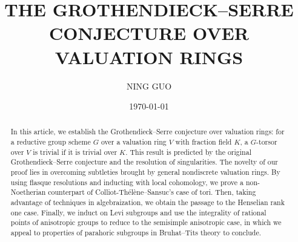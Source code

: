 \documentclass[a4paper,11pt,reqno]{amsart}
\newcommand{\q}{\quad}
\theoremstyle{plain}
\theoremstyle{remark}
\theoremstyle{definition}
\theoremstyle{plain}
\theoremstyle{definition}
\theoremstyle{subsection-tweak}
\theoremstyle{subsection-tweak}
\numberwithin{equation}{subsection}
\begin{document}
      
      
      \title{THE GROTHENDIECK--SERRE CONJECTURE OVER VALUATION RINGS}
      
      \author{NING GUO}
      \address{D\'{e}partement de Math\'{e}matiques, Universit\'{e} Paris-Sud, Orsay Cedex, France }
      \date{\today}
      
      
      \begin{abstract}
      In this article, we establish the Grothendieck--Serre conjecture over valuation rings: for a reductive group scheme $G$ over a valuation ring $V$ with fraction field $K$, a $G$-torsor over $V$ is trivial if it is trivial over $K$.
      This result is predicted by the original Grothendieck--Serre conjecture and the resolution of singularities.
      The novelty of our proof lies in overcoming subtleties brought by general nondiscrete valuation rings.
      By using flasque resolutions and inducting with local cohomology, we
      prove a non-Noetherian counterpart of Colliot-Th\'el\`ene--Sansuc's case of tori.
      Then, taking advantage of techniques in algebraization, we obtain the passage to the Henselian rank one case.
      Finally, we induct on Levi subgroups and use the integrality of rational points of anisotropic groups to reduce to the semisimple anisotropic case, in which we appeal to properties of parahoric subgroups in Bruhat--Tits theory to conclude.
      \end{abstract}
      
      \small\maketitle
      
      \hypersetup{
          linktoc=page,     %
      }
      \renewcommand*\contentsname{}
      \tableofcontents
      
      
\end{document}

